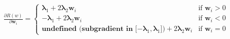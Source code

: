 \documentclass[preview]{standalone}
\begin{document}
\begin{align*}
\frac{\partial R(w)}{\partial \mathbf{w}_i} =\begin{cases}\mathbf{\lambda}_1 + 2\mathbf{\lambda}_2 \mathbf{w}_i & \text{if } \mathbf{w}_i > 0 \\-\mathbf{\lambda}_1 + 2\mathbf{\lambda}_2 \mathbf{w}_i & \text{if } \mathbf{w}_i < 0 \\\mathbf{\text{undefined (subgradient in }[-}\mathbf{\lambda}_1, \mathbf{\lambda}_1]) + 2\mathbf{\lambda}_2 \mathbf{w}_i & \text{if } \mathbf{w}_i = 0\end{cases}
\end{align*}
\end{document}
